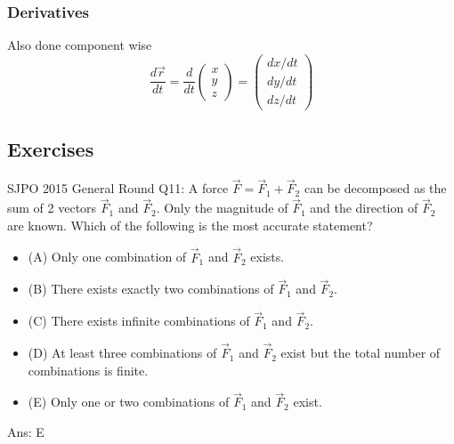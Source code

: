 \documentclass{article}
\begin{document}
\subsubsection{Derivatives}
Also done component wise
$$\frac{d\vec{r}}{dt} = \frac{d}{dt}\left(
    \begin{array}{c}  
         x \\
         y \\
         z
    \end{array} 
    \right) = \left(
    \begin{array}{c}  
         dx/dt \\
         dy/dt \\
         dz/dt
    \end{array} 
    \right)
$$

\subsection{Exercises}
\begin{samepage}
SJPO 2015 General Round Q11: A force $\vec{F} = \vec{F}_1 + \vec{F}_2$ can be decomposed as the sum of 2 vectors $\vec{F}_1$ and $\vec{F}_2$. Only the magnitude of $\vec{F}_1$ and the direction of $\vec{F}_2$ are known. Which of the following is the most accurate statement?
\begin{itemize}
\item[](A) Only one combination of $\vec{F}_1$ and $\vec{F}_2$ exists.
\item[](B) There exists exactly two combinations of $\vec{F}_1$ and $\vec{F}_2$.
\item[](C) There exists infinite combinations of $\vec{F}_1$ and $\vec{F}_2$.
\item[](D) At least three combinations of $\vec{F}_1$ and $\vec{F}_2$ exist but the total number of combinations is finite.
\item[](E) Only one or two combinations of $\vec{F}_1$ and $\vec{F}_2$ exist.
\end{itemize}
Ans: E
\end{samepage}
\end{document}
